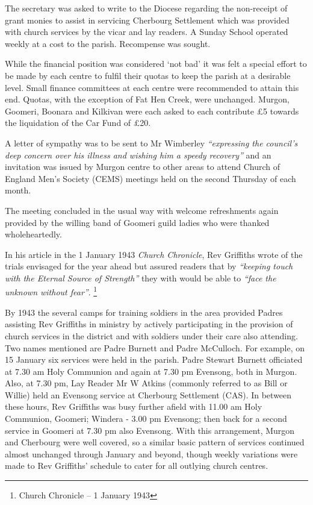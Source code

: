 The secretary was asked to write to the Diocese regarding the non-receipt of grant monies to assist in servicing Cherbourg Settlement which was provided with church services by the vicar and lay readers. A Sunday School operated weekly at a cost to the parish. Recompense was sought.



While the financial position was considered `not bad' it was felt a special effort to be made by each centre to fulfil their quotas to keep the parish at a desirable level. Small finance committees at each centre were recommended to attain this end. Quotas, with the exception of Fat Hen Creek, were unchanged. Murgon, Goomeri, Boonara and Kilkivan were each asked to each contribute \pounds5 towards the liquidation of the Car Fund of \pounds20.



A letter of sympathy was to be sent to Mr Wimberley \emph{``expressing the council's deep concern over his illness and wishing him a speedy recovery''} and an invitation was issued by Murgon centre to other areas to attend Church of England Men's Society (CEMS) meetings held on the second Thursday of each month.



The meeting concluded in the usual way with welcome refreshments again provided by the willing band of Goomeri guild ladies who were thanked wholeheartedly.



In his article in the 1 January 1943 \emph{Church Chronicle}, Rev Griffiths wrote of the trials envisaged for the year ahead but assured readers that by \emph{``keeping touch with the Eternal Source of Strength''} they with would be able to \emph{``face the unknown without fear''}. \footnote{Church Chronicle -- 1 January 1943}


By 1943 the several camps for training soldiers in the area provided Padres assisting Rev Griffiths in ministry by actively participating in the provision of church services in the district and with soldiers under their care also attending. Two names mentioned are Padre Burnett and Padre McCulloch. For example, on 15 January six services were held in the parish. Padre Stewart Burnett officiated at 7.30 am Holy Communion and again at 7.30 pm Evensong, both in Murgon. Also, at 7.30 pm, Lay Reader Mr W Atkins (commonly referred to as Bill or Willie) held an Evensong service at Cherbourg Settlement (CAS). In between these hours, Rev Griffiths was busy further afield with 11.00 am Holy Communion, Goomeri; Windera - 3.00 pm Evensong; then back for a second service in Goomeri at 7.30 pm also Evensong. With this arrangement, Murgon and Cherbourg were well covered, so a similar basic pattern of services continued almost unchanged through January and beyond, though weekly variations were made to Rev Griffiths' schedule to cater for all outlying church centres.



